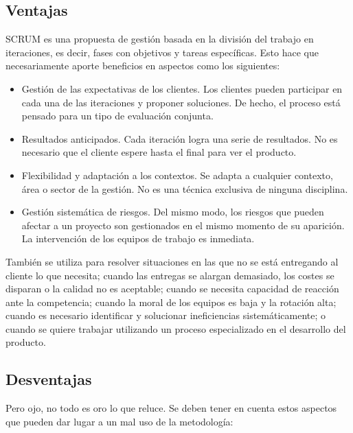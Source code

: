 \begin{enumerate}
\end{enumerate}

\subsection{Ventajas}

SCRUM es una propuesta de gestión basada en la división del trabajo en iteraciones, es decir, fases con objetivos y tareas específicas. Esto hace que necesariamente aporte beneficios en aspectos como los siguientes:

\begin{itemize}
\item Gestión de las expectativas de los clientes. Los clientes pueden participar en cada una de las iteraciones y proponer soluciones. De hecho, el proceso está pensado para un tipo de evaluación conjunta.
\item Resultados anticipados. Cada iteración logra una serie de resultados. No es necesario que el cliente espere hasta el final para ver el producto.
\item Flexibilidad y adaptación a los contextos. Se adapta a cualquier contexto, área o sector de la gestión. No es una técnica exclusiva de ninguna disciplina.
\item Gestión sistemática de riesgos. Del mismo modo, los riesgos que pueden afectar a un proyecto son gestionados en el mismo momento de su aparición. La intervención de los equipos de trabajo es inmediata.
\end{itemize}

También se utiliza para resolver situaciones en las que no se está entregando al cliente lo que necesita; cuando las entregas se alargan demasiado, los costes se disparan o la calidad no es aceptable; cuando se necesita capacidad de reacción ante la competencia; cuando la moral de los equipos es baja y la rotación alta; cuando es necesario identificar y solucionar ineficiencias sistemáticamente; o cuando se quiere trabajar utilizando un proceso especializado en el desarrollo del producto.

\subsection{Desventajas}

Pero ojo, no todo es oro lo que reluce. Se deben tener en cuenta estos aspectos que pueden dar lugar a un mal uso de la metodología:


